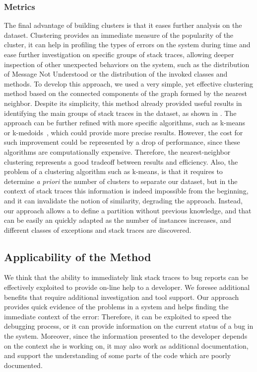 \subsubsection{Metrics}
The final advantage of building clusters is that it eases further analysis on the dataset.
Clustering provides an immediate measure of the popularity of the cluster, it can help in profiling the types of errors on the system during time and ease further investigation on specific groups of stack traces, allowing deeper inspection of other unexpected behaviors on the system, such as the distribution of Message Not Understood or  the distribution of the invoked classes and methods.
To develop this approach, we used a very simple, yet effective clustering method based on the connected components of the graph formed by the nearest neighbor.
Despite its simplicity, this method already provided useful results in identifying the main groups of stack traces in the dataset, as shown in .
The approach can be further refined with more specific algorithms, such as k-means~\cite{MacQ1967} or k-medoids~\cite{Kauf1987,Park2009}, which could provide more precise results.
However, the cost for such improvement could be represented by a drop of performance, since these algorithms are computationally expensive.
Therefore, the nearest-neighbor clustering  represents a good tradeoff between results and efficiency.
Also, the problem of a clustering algorithm such as k-means, is that it requires to determine \emph{a priori} the number of clusters to separate our dataset, but in the context of stack traces this information is indeed impossible from the beginning, and it can invalidate the notion of similarity, degrading the approach.
Instead, our approach allows a to define a partition without previous knowledge, and that can be easily an quickly adapted as the number of instances increases, and different classes of exceptions and stack traces are discovered.


\subsection{Applicability of the Method}

We think that the ability to immediately link stack traces to bug reports can be effectively exploited to provide on-line help to a developer.
We foresee additional benefits that require additional investigation and tool support.
Our approach provides quick evidence of the problems in a system and helps finding the immediate context of the error: Therefore, it can be exploited to speed the debugging process, or it can provide information on the current status of a bug in the system.
Moreover, since the information presented to the developer depends on the context she is working on, it may also work as additional documentation, and support the understanding of some parts of the code which are poorly documented.

